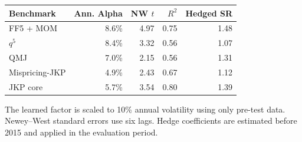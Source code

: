 \begin{threeparttable}
\begin{tabular}{lrrrr}
\toprule
Benchmark & Ann. Alpha & NW $t$ & $R^2$ & Hedged SR \\
\midrule
FF5 + MOM & 8.6\% & 4.97 & 0.75 & 1.48 \\
$q^5$ & 8.4\% & 3.32 & 0.56 & 1.07 \\
QMJ & 7.0\% & 2.15 & 0.56 & 1.31 \\
Mispricing-JKP & 4.9\% & 2.43 & 0.67 & 1.12 \\
JKP core & 5.7\% & 3.54 & 0.80 & 1.39 \\
\bottomrule
\end{tabular}
\begin{tablenotes}\footnotesize\item The learned factor is scaled to 10\% annual volatility using only pre-test data. Newey--West standard errors use six lags. Hedge coefficients are estimated before 2015 and applied in the evaluation period.\end{tablenotes}
\end{threeparttable}
